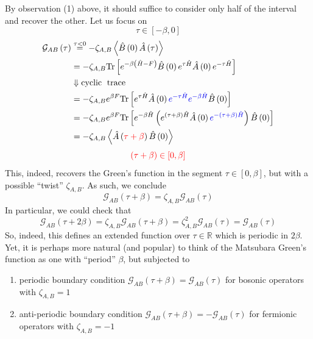 By observation (1) above, it should suffice to consider only half of the interval and recover the other. Let us focus on
\[ \tau \in \left[ -\beta ,0 \right] \]
\begin{align*}
    \mathcal{G} _{AB}\left( \tau \right) &\stackrel{\tau <0}{=}-\zeta _{A,B}\left< \hat{B}\left( 0 \right) \hat{A}\left( \tau \right) \right> \\
    &=-\zeta _{A,B}\mathrm{Tr}\left[ e^{-\beta \left( \hat{H}-F \right)}\hat{B}\left( 0 \right) e^{\tau \hat{H}}\hat{A}\left( 0 \right) e^{-\tau \hat{H}} \right] \\
    &\Downarrow \text{cyclic\; trace}\\
    &=-\zeta _{A,B}e^{\beta F}\mathrm{Tr}\left[ e^{\tau \hat{H}}\hat{A}\left( 0 \right) {\color[RGB]{0, 0, 240} e^{-\tau \hat{H}}e^{-\beta \hat{H}}}\hat{B}\left( 0 \right) \right] \\
    &=-\zeta _{A,B}e^{\beta F}\mathrm{Tr}\left[ e^{-\beta \hat{H}}\left( e^{\left( \tau +\beta \right) \hat{H}}\hat{A}\left( 0 \right) {\color[RGB]{0, 0, 240} e^{-\left( \tau +\beta \right) \hat{H}}} \right) \hat{B}\left( 0 \right) \right] \\
    &=-\zeta _{A,B}\left< \hat{A}\left( {\color{red} \tau +\beta } \right) \hat{B}\left( 0 \right) \right>
\end{align*}
\[ {\color{red} \left( \tau +\beta \right) \in \left[ 0,\beta \right] }\]
This, indeed, recovers the Green's function in the segment $\tau \in \left[ 0,\beta \right]$, but with a possible ``twist'' $\zeta_{A,B}$. As such, we conclude
\[ \mathcal{G} _{AB}\left( \tau +\beta \right) =\zeta _{A,B}\mathcal{G} _{AB}\left( \tau \right) \]
In particular, we could check that
\[ \mathcal{G} _{AB}\left( \tau +2\beta \right) =\zeta _{A,B}\mathcal{G} _{AB}\left( \tau +\beta \right) =\zeta _{A,B}^{2}\mathcal{G} _{AB}\left( \tau \right) =\mathcal{G} _{AB}\left( \tau \right) \]
So, indeed, this defines an extended function over $\tau\in\mathbb{R}$ which is periodic in $2\beta$. Yet, it is perhaps more natural (and popular) to think of the Matsubara Green's function as one with ``period'' $\beta$, but subjected to
\begin{enumerate}
    \item periodic boundary condition $\mathcal{G} _{AB}\left( \tau +\beta \right) =\mathcal{G} _{AB}\left( \tau \right)$ for bosonic operators with $\zeta _{A,B}=1$
    \item anti-periodic boundary condition $\mathcal{G} _{AB}\left( \tau +\beta \right) =-\mathcal{G} _{AB}\left( \tau \right)$ for fermionic operators with $\zeta _{A,B}=-1$
\end{enumerate}
